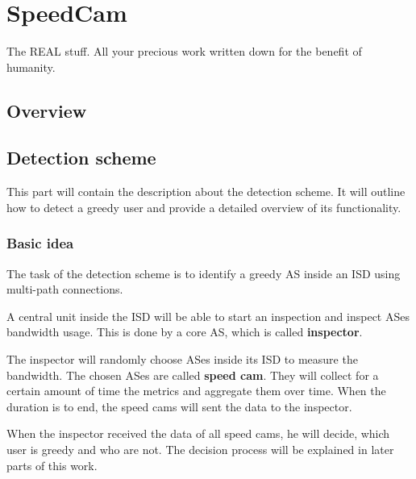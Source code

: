 \documentclass[thesis.tex]{subfiles}
\begin{document}
\chapter{SpeedCam}\label{chap:basics}

The REAL stuff. All your precious work written down for the benefit of humanity.

\section{Overview}

\section{Detection scheme}
This part will contain the description about the detection scheme. It will outline how to detect a greedy user and provide a detailed overview of its functionality.

\subsection{Basic idea}
The task of the detection scheme is to identify a greedy AS inside an ISD using multi-path connections. 

A central unit inside the ISD will be able to start an inspection and inspect ASes bandwidth usage. This is done by a core AS, which is called \textbf{inspector}. 

The inspector will randomly choose ASes inside its ISD to measure the bandwidth. The chosen ASes are called \textbf{speed cam}. They will collect for a certain amount of time the metrics and aggregate them over time. When the duration is to end, the speed cams will sent the data to the inspector.

When the inspector received the data of all speed cams, he will decide, which user is greedy and who are not. The decision process will be explained in later parts of this work.
\end{document}
